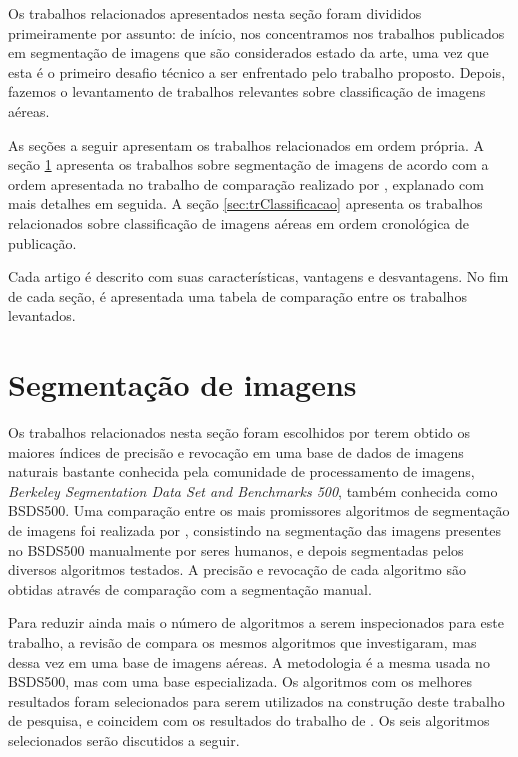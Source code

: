 Os trabalhos relacionados apresentados nesta seção foram divididos primeiramente por assunto: de início, nos concentramos nos trabalhos publicados em segmentação de imagens que são considerados estado da arte, uma vez que esta é o primeiro desafio técnico a ser enfrentado pelo trabalho proposto. Depois, fazemos o levantamento de trabalhos relevantes sobre classificação de imagens aéreas.

As seções a seguir apresentam os trabalhos relacionados em ordem própria.  A seção \ref{sec:trSegmentacao} apresenta os trabalhos sobre segmentação de imagens de acordo com a ordem apresentada no trabalho de comparação realizado por , explanado com mais detalhes em seguida. A seção \ref{sec:trClassificacao} apresenta os trabalhos relacionados sobre classificação de imagens aéreas em ordem cronológica de publicação.

Cada artigo é descrito com suas características, vantagens e desvantagens. No fim de cada seção, é apresentada uma tabela de comparação entre os trabalhos levantados.

\section{Segmentação de imagens}\label{sec:trSegmentacao}

Os trabalhos relacionados nesta seção foram escolhidos por terem obtido os maiores índices de precisão e revocação em uma base de dados de imagens naturais bastante conhecida pela comunidade de processamento de imagens, \textit{Berkeley Segmentation Data Set and Benchmarks 500}, também conhecida como BSDS500. Uma comparação entre os mais promissores algoritmos de segmentação de imagens foi realizada por , consistindo na segmentação das imagens presentes no BSDS500 manualmente por seres humanos, e depois segmentadas pelos diversos algoritmos testados. A precisão e revocação de cada algoritmo são obtidas através de comparação com a segmentação manual.

Para reduzir ainda mais o número de algoritmos a serem inspecionados para este trabalho, a revisão de  compara os mesmos algoritmos que  investigaram, mas dessa vez em uma base de imagens aéreas. A metodologia é a mesma usada no BSDS500, mas com uma base especializada. Os algoritmos com os melhores resultados foram selecionados para serem utilizados na construção deste trabalho de pesquisa, e coincidem com os resultados do trabalho de . Os seis algoritmos selecionados serão discutidos a seguir.

